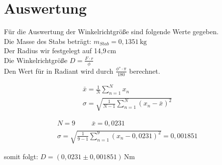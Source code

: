 \section{Auswertung} 
\begin{flushleft}
    Für die Auswertung der Winkelrichtgröße sind folgende Werte gegeben.\\
    Die Masse des Stabs beträgt: $ m_{Stab} = 0,1351\, \unit{\kilogram} $ \\
    Der Radius wir festgelegt auf 14,9\,cm  \\
    Die Winkelrichtgröße $ D = \frac{F\cdot r}{\phi}$ \\
    Den Wert für \phi in Radiant wird durch $ \frac{\phi° \cdot \pi}{180} $ berechnet. \\
\end{flushleft}

\begin{align*}
    \bar{x} = \frac{1}{N} \sum \limits_{n=1}^{N} x_{n}  \\
     \sigma = \sqrt{\frac{1}{N-1} \sum \limits_{n=1}^{N} (x_{n}-\bar{x})^2 } 
\end{align*}

\begin{align*}
    N = 9 \hspace{1cm} \bar{x} = 0,0231 \\
   \sigma = \sqrt{\frac{1}{9-1} \sum \limits_{n=1}^{9} (x_{n}-0,0231)^2} = 0,001851
\end{align*}

somit folgt:  $ D=(0,0231 \pm 0,001851)\, \unit{\newton\meter}$

